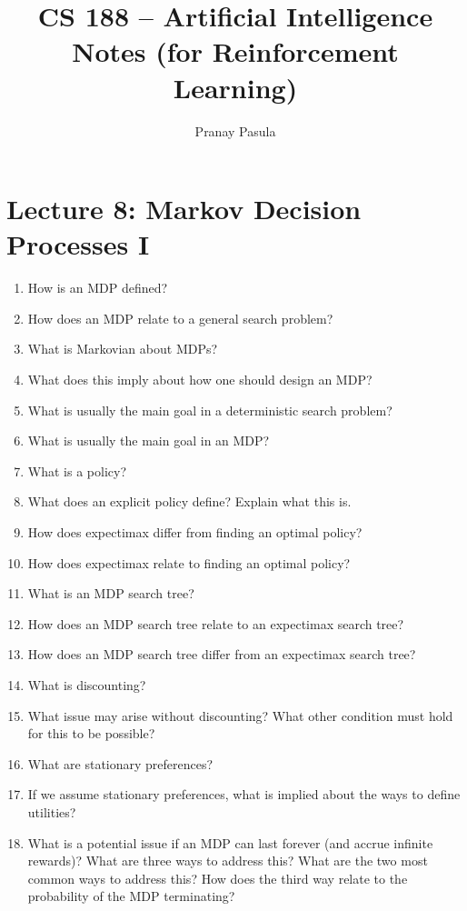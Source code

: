 \documentclass[]{article}
\title{CS 188 -- Artificial Intelligence Notes (for Reinforcement Learning)}
\author{Pranay Pasula}
\begin{document}
\maketitle

\section*{Lecture 8: Markov Decision Processes I}
\begin{enumerate}
\item How is an MDP defined?
\item How does an MDP relate to a general search problem? \\
\item What is Markovian about MDPs?
\item What does this imply about how one should design an MDP? \\
\item What is usually the main goal in a deterministic search problem?
\item What is usually the main goal in an MDP? \\
\item What is a policy?
\item What does an explicit policy define? Explain what this is.
\item How does expectimax differ from finding an optimal policy?
\item How does expectimax relate to finding an optimal policy? \\
\item What is an MDP search tree?
\item How does an MDP search tree relate to an expectimax search tree?
\item How does an MDP search tree differ from an expectimax search tree? \\
\item What is discounting?
\item What issue may arise without discounting? What other condition must hold for this to be possible? \\
\item What are stationary preferences?
\item If we assume stationary preferences, what is implied about the ways to define utilities? \\
\item What is a potential issue if an MDP can last forever (and accrue infinite rewards)? What are three ways to address this? What are the two most common ways to address this? How does the third way relate to the probability of the MDP terminating? \\

\end{enumerate}
\end{document}

